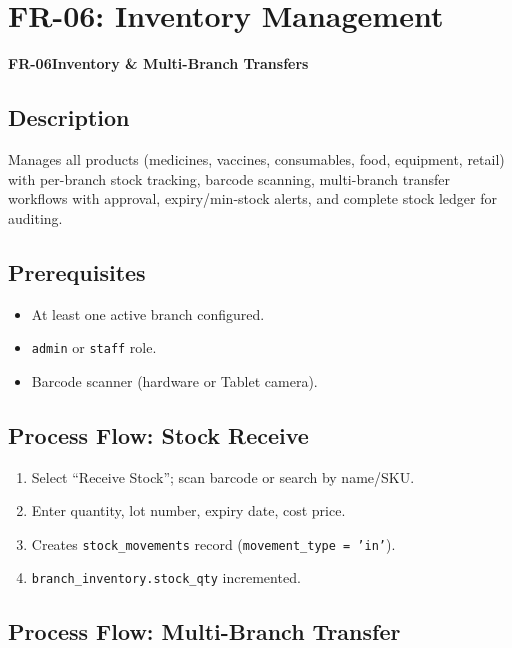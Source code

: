\documentclass[12pt,a4paper]{report}
\newcommand{\moduleheader}[2]{%
  \par\vspace{6pt}%
  \noindent\colorbox{branddark}{\color{white}\textbf{\small #1}}\quad\textbf{\large #2}%
  \par\vspace{4pt}%
}
\begin{document}
\chapter{FR-06: Inventory Management}

\moduleheader{FR-06}{Inventory \& Multi-Branch Transfers}

\section{Description}

Manages all products (medicines, vaccines, consumables, food, equipment, retail) with per-branch stock tracking, barcode scanning, multi-branch transfer workflows with approval, expiry/min-stock alerts, and complete stock ledger for auditing.

\section{Prerequisites}

\begin{itemize}
  \item At least one active branch configured.
  \item \texttt{admin} or \texttt{staff} role.
  \item Barcode scanner (hardware or Tablet camera).
\end{itemize}

\section{Process Flow: Stock Receive}

\begin{enumerate}
  \item Select ``Receive Stock''; scan barcode or search by name/SKU.
  \item Enter quantity, lot number, expiry date, cost price.
  \item Creates \texttt{stock\_movements} record (\texttt{movement\_type = 'in'}).
  \item \texttt{branch\_inventory.stock\_qty} incremented.
\end{enumerate}

\section{Process Flow: Multi-Branch Transfer}
\end{document}

